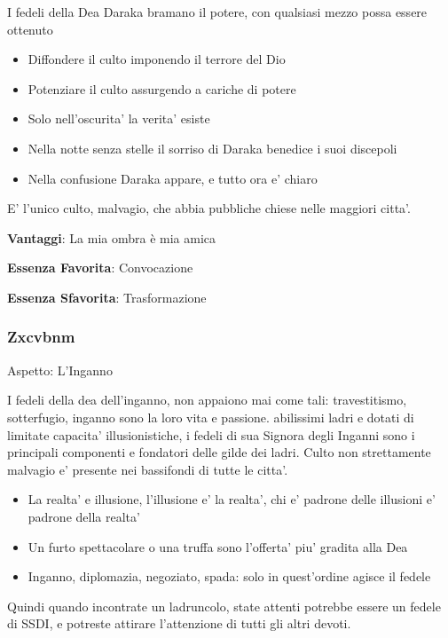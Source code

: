 \documentclass[a4paper,11pt,twoside,openany]{book}
\begin{document}
I fedeli della Dea Daraka bramano il potere, con qualsiasi mezzo possa essere ottenuto

\begin{itemize}
	\item Diffondere il culto imponendo il terrore del Dio
	\item Potenziare il culto assurgendo a cariche di potere
	\item Solo nell'oscurita' la verita' esiste
	\item Nella notte senza stelle il sorriso di Daraka benedice i suoi discepoli
	\item Nella confusione Daraka appare, e tutto ora e' chiaro
\end{itemize}


E' l'unico culto, malvagio, che abbia pubbliche chiese nelle maggiori citta'.


\textbf{Vantaggi}: La mia ombra è mia amica

\textbf{Essenza Favorita}: Convocazione

\textbf{Essenza Sfavorita}: Trasformazione
\bigskip

\subsubsection{Zxcvbnm}

Aspetto: L'Inganno
\bigskip


I fedeli della dea dell'inganno, non appaiono mai come tali: travestitismo, sotterfugio, inganno sono la loro vita e passione. abilissimi ladri e dotati di limitate capacita' illusionistiche, i fedeli di sua Signora degli Inganni sono i principali componenti e fondatori delle gilde dei ladri. Culto non strettamente malvagio e' presente nei bassifondi di tutte le citta'.

\begin{itemize}
	\item La realta' e illusione, l'illusione e' la realta', chi e' padrone delle illusioni e' padrone della realta'
	\item Un furto spettacolare o una truffa sono l'offerta' piu' gradita alla Dea
	\item Inganno, diplomazia, negoziato, spada: solo in quest'ordine agisce il fedele
\end{itemize}

Quindi quando incontrate un ladruncolo, state attenti potrebbe essere un fedele di SSDI, e potreste attirare l'attenzione di tutti gli altri devoti.
\end{document}
